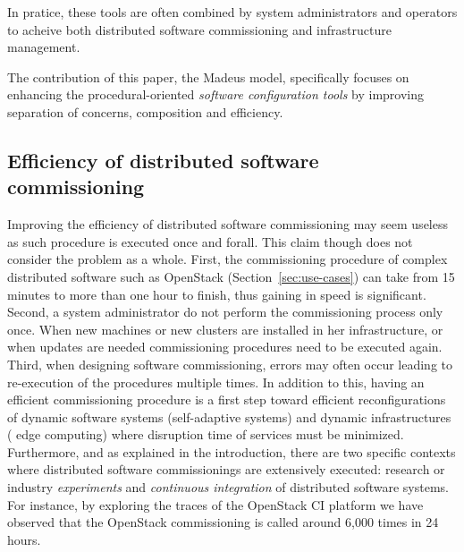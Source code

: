 In pratice, these tools are often combined by system administrators
and operators to acheive both distributed software commissioning and
infrastructure management.

\begin{tcolorbox}[enhanced,attach boxed title to top left={yshift=-3mm,yshifttext=-1mm},
  colback=black!5!white,colframe=black!30,colbacktitle=black!60,
  title=Scope,fonttitle=\bfseries,
  boxed title style={size=small,colframe=black!60,boxrule=0.2mm},
  boxrule=0.2mm]
  The contribution of this paper, \ie the Madeus model, specifically
  focuses on enhancing the procedural-oriented \emph{software
    configuration tools} by improving separation of concerns,
  composition and efficiency.
\end{tcolorbox}


\subsection{Efficiency of distributed software commissioning}

Improving the efficiency of distributed software commissioning may
seem useless as such procedure is executed once and forall. This claim
though does not consider the problem as a whole.
%
First, the commissioning procedure of complex distributed software
such as OpenStack (Section~\ref{sec:use-cases}) can take from 15
minutes to more than one hour to finish, thus gaining in speed is
significant. Second, a system administrator do not perform the
commissioning process only once. When new machines or new clusters are
installed in her infrastructure, or when updates are needed
commissioning procedures need to be executed again. Third, when
designing software commissioning, errors may often occur leading to
re-execution of the procedures multiple times.
In addition to this, having an efficient commissioning procedure is a
first step toward efficient reconfigurations of dynamic software
systems (\eg self-adaptive systems) and dynamic infrastructures (\eg
edge computing) where disruption time of services must be minimized.
Furthermore, and as explained in the introduction, there are two
specific contexts where distributed software commissionings are
extensively executed: research or industry \emph{experiments} and
\emph{continuous integration} of distributed software systems. For
instance, by exploring the traces of the OpenStack CI platform we have
observed that the OpenStack commissioning is called around 6,000 times
in 24 hours.

